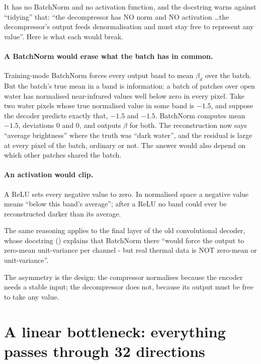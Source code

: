 It has no BatchNorm and no activation function, and the docstring warns against ``tidying'' that:
``the decompressor has NO norm and NO activation \ldots the decompressor's output feeds denormalisation
and must stay free to represent any value''. Here is what each would break.

\paragraph{A BatchNorm would erase what the batch has in common.} Training-mode BatchNorm forces every
output band to mean $\beta_d$ over the batch. But the batch's true mean in a band is information: a batch
of patches over open water has normalised near-infrared values well below zero in every pixel. Take two
water pixels whose true normalised value in some band is $-1.5$, and suppose the decoder predicts
exactly that, $-1.5$ and $-1.5$. BatchNorm computes mean $-1.5$, deviations $0$ and $0$, and outputs
$\beta$ for both. The reconstruction now says ``average brightness'' where the truth was ``dark water'',
and the residual is large at every pixel of the batch, ordinary or not. The answer would also depend on
which other patches shared the batch.

\paragraph{An activation would clip.} A ReLU sets every negative value to zero. In normalised space a
negative value means ``below this band's average''; after a ReLU no band could ever be reconstructed
darker than its average.

The same reasoning applies to the final layer of the old convolutional decoder, whose docstring
() explains that BatchNorm there ``would force
the output to zero-mean unit-variance per channel - but real thermal data is NOT zero-mean or
unit-variance''.

\begin{keypoint}
The asymmetry is the design: the compressor normalises because the encoder needs a stable input; the
decompressor does not, because its output must be free to take any value.
\end{keypoint}

\section{A linear bottleneck: everything passes through 32 directions}\label{sec:compressor:rank}

